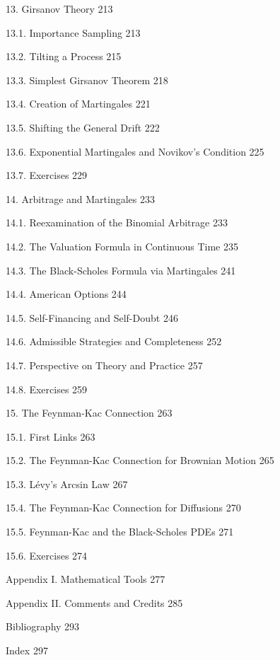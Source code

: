 13. Girsanov Theory 213



13.1. Importance Sampling 213



13.2. Tilting a Process 215



13.3. Simplest Girsanov Theorem 218



13.4. Creation of Martingales 221



13.5. Shifting the General Drift 222



13.6. Exponential Martingales and Novikov's Condition 225



13.7. Exercises 229



14. Arbitrage and Martingales 233



14.1. Reexamination of the Binomial Arbitrage 233



14.2. The Valuation Formula in Continuous Time 235



14.3. The Black-Scholes Formula via Martingales 241



14.4. American Options 244



14.5. Self-Financing and Self-Doubt 246



14.6. Admissible Strategies and Completeness 252



14.7. Perspective on Theory and Practice 257



14.8. Exercises 259



15. The Feynman-Kac Connection 263



15.1. First Links 263



15.2. The Feynman-Kac Connection for Brownian Motion 265



15.3. Lévy's Arcsin Law 267



15.4. The Feynman-Kac Connection for Diffusions 270



15.5. Feynman-Kac and the Black-Scholes PDEs 271



15.6. Exercises 274



Appendix I. Mathematical Tools 277



Appendix II. Comments and Credits 285



Bibliography 293



Index 297

